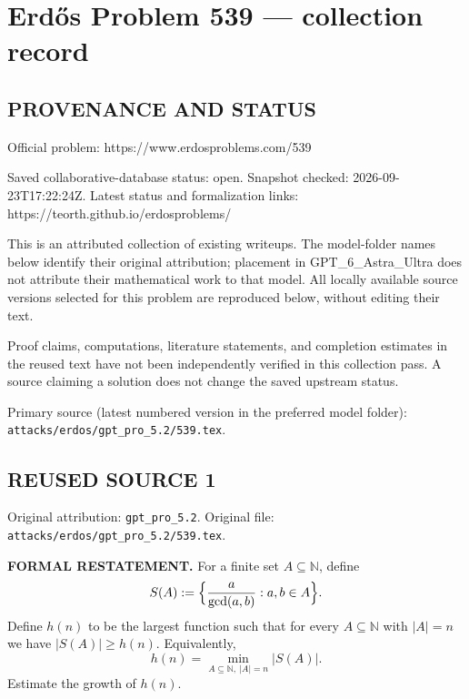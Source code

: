 \section*{Erd\H{o}s Problem 539 --- collection record}

\subsection*{PROVENANCE AND STATUS}
Official problem: https://www.erdosproblems.com/539

Saved collaborative-database status: open.
Snapshot checked: 2026-09-23T17:22:24Z.
Latest status and formalization links: https://teorth.github.io/erdosproblems/

This is an attributed collection of existing writeups. The model-folder names below identify their original attribution; placement in GPT\_6\_Astra\_Ultra does not attribute their mathematical work to that model. All locally available source versions selected for this problem are reproduced below, without editing their text.

Proof claims, computations, literature statements, and completion estimates in the reused text have not been independently verified in this collection pass. A source claiming a solution does not change the saved upstream status.

Primary source (latest numbered version in the preferred model folder): \texttt{attacks/erdos/gpt\_pro\_5.2/539.tex}.

\subsection*{REUSED SOURCE 1}
Original attribution: \texttt{gpt\_pro\_5.2}.
Original file: \texttt{attacks/erdos/gpt\_pro\_5.2/539.tex}.


\noindent\textbf{FORMAL RESTATEMENT.}
For a finite set $A\subseteq\mathbb N$, define
\[
S(A):=\Bigl\{\frac{a}{\gcd(a,b)}: a,b\in A\Bigr\}.
\]
Define $h(n)$ to be the largest function such that for every $A\subseteq\mathbb N$ with $|A|=n$ we have $|S(A)|\ge h(n)$.
Equivalently,
\[
 h(n)=\min_{A\subseteq\mathbb N,\ |A|=n} |S(A)|.
\]
Estimate the growth of $h(n)$.

